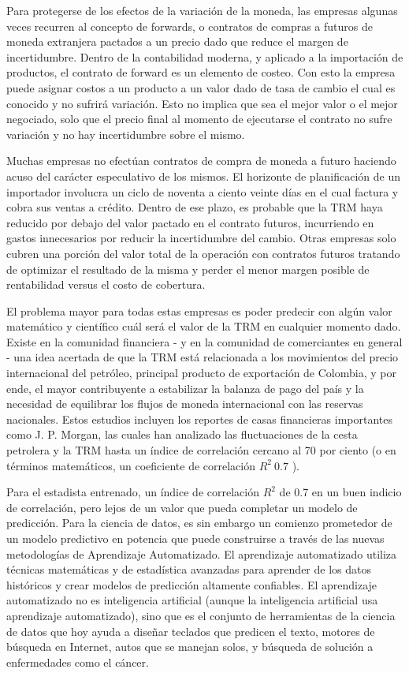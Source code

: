 Para protegerse de los efectos de la variación de la moneda, las empresas algunas veces recurren al concepto de forwards, o contratos de compras a futuros de moneda extranjera pactados a un precio dado que reduce el margen de incertidumbre. Dentro de la contabilidad moderna, y aplicado a la importación de productos, el contrato de forward es un elemento de costeo. Con esto la empresa puede asignar costos a un producto a un valor dado de tasa de cambio el cual es conocido y no sufrirá variación. Esto no implica que sea el mejor valor o el mejor negociado, solo que el precio final al momento de ejecutarse el contrato no sufre variación y no hay incertidumbre sobre el mismo.

Muchas empresas no efectúan contratos de compra de moneda a futuro haciendo acuso del carácter especulativo de los mismos. El horizonte de planificación de un importador involucra un ciclo de noventa a ciento veinte días en el cual factura y cobra sus ventas a crédito. Dentro de ese plazo, es probable que la TRM haya reducido por debajo del valor pactado en el contrato futuros, incurriendo en gastos innecesarios por reducir la incertidumbre del cambio. Otras empresas solo cubren una porción del valor total de la operación con contratos futuros tratando de optimizar el resultado de la misma y perder el menor margen posible de rentabilidad versus el costo de cobertura.

El problema mayor para todas estas empresas es poder predecir con algún valor matemático y científico cuál será el valor de la TRM en cualquier momento dado. Existe en la comunidad financiera - y en la comunidad de comerciantes en general - una idea acertada de que la TRM está relacionada a los movimientos del precio internacional del petróleo, principal producto de exportación de Colombia, y por ende, el mayor contribuyente a estabilizar la balanza de pago del país y la necesidad de equilibrar los flujos de moneda internacional con las reservas nacionales. Estos estudios incluyen los reportes de casas financieras importantes como J. P. Morgan, las cuales han analizado las fluctuaciones de la cesta petrolera y la TRM hasta un índice de correlación cercano al 70 por ciento (o en términos matemáticos, un coeficiente de correlación \(R^{2} ~ 0.7\) ).

Para el estadista entrenado, un índice de correlación \(R^{2}\) de 0.7 en un buen indicio de correlación, pero lejos de un valor que pueda completar un modelo de predicción. Para la ciencia de datos, es sin embargo un comienzo prometedor de un modelo predictivo en potencia que puede construirse a través de las nuevas metodologías de Aprendizaje Automatizado. El aprendizaje automatizado utiliza técnicas matemáticas y de estadística avanzadas para aprender de los datos históricos y crear modelos de predicción altamente confiables. El aprendizaje automatizado no es inteligencia artificial (aunque la inteligencia artificial usa aprendizaje automatizado), sino que es el conjunto de herramientas de la ciencia de datos que hoy ayuda a diseñar teclados que predicen el texto, motores de búsqueda en Internet, autos que se manejan solos, y búsqueda de solución a enfermedades como el cáncer.

